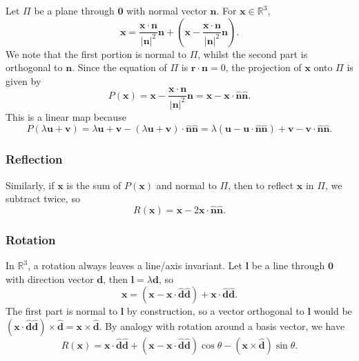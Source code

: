 \documentclass[10pt,notitlepage]{revtex4-1}
\newcommand{\xb}{\boldsymbol{x}}
\newcommand{\ub}{\boldsymbol{u}}
\newcommand{\vb}{\boldsymbol{v}}
\newcommand{\db}{{\boldsymbol{d}}}
\newcommand{\lb}{{\boldsymbol{l}}}
\newcommand{\nb}{{\boldsymbol{n}}}
\begin{document}
Let $\Pi$ be a plane through $\boldsymbol{0}$ with normal vector $\nb$. For
$\xb\in\mathbb{R}^3$,
\begin{equation}
	\xb=\frac{\xb\cdot\nb}{|\nb|^2}\nb
	+\left(\xb-\frac{\xb\cdot\nb}{|\nb|^2}\nb\right).
\end{equation}
We note that the first portion is normal to $\Pi$, whilst the second part is
orthogonal to $\nb$. Since the equation of $\Pi$ is $\boldsymbol{r}\cdot\nb=0$,
the projection of $\xb$ onto $\Pi$ is given by
\begin{equation}
	P(\xb)=\xb-\frac{\xb\cdot\nb}{|\nb|^2}\nb=\xb-\xb\cdot\hat{\nb}\hat{\nb}.
\end{equation}
This is a linear map because
\begin{equation}
	P(\lambda\ub+\vb)=\lambda\ub+\vb-(\lambda\ub+\vb)\cdot\hat{\nb}\hat{\nb}
	=\lambda(\ub-\ub\cdot\hat{\nb}\hat{\nb})+\vb-\vb\cdot\hat{\nb}\hat{\nb}.
\end{equation}

\subsubsection{Reflection}

Similarly, if $\xb$ is the sum of $P(\xb)$ and normal to $\Pi$, then to reflect
$\xb$ in $\Pi$, we subtract twice, so
\begin{equation}
	R(\xb)=\xb-2\xb\cdot\hat{\nb}\hat{\nb}.
\end{equation}

\subsubsection{Rotation}

In $\mathbb{R}^3$, a rotation always leaves a line/axis invariant. Let $\lb$ be
a line through $\boldsymbol{0}$ with direction vector $\db$, then
$\lb=\lambda\db$, so
\begin{equation}
	\xb=(\xb-\xb\cdot\hat{\db}\hat{\db})+\xb\cdot\hat{\db}\hat{\db}.
\end{equation}
The first part is normal to $\lb$ by construction, so a vector orthogonal to
$\lb$ would be $(\xb\cdot\hat{\db}\hat{\db})\times\hat{\db}=\xb\times\hat{\db}$.
By analogy with rotation around a basis vector, we have
\begin{equation}
	R(\xb)=\xb\cdot\hat{\db}\hat{\db}+(\xb-\xb\cdot\hat{\db}\hat{\db})\cos\theta
	-(\xb\times\hat{\db})\sin\theta.
\end{equation}
\end{document}

